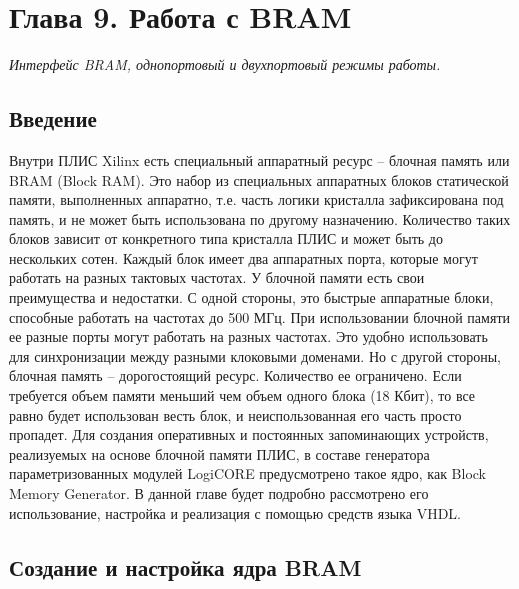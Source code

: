 \chapter{Глава 9. Работа с BRAM}

\emph{Интерфейс BRAM, однопортовый и двухпортовый режимы работы.}

\section{Введение}

Внутри ПЛИС Xilinx есть специальный аппаратный ресурс – блочная память или BRAM (Block RAM). Это набор из специальных аппаратных блоков статической памяти, выполненных аппаратно, т.е. часть логики кристалла зафиксирована под память, и не может быть использована по другому назначению. Количество таких блоков зависит от конкретного типа кристалла ПЛИС и может быть до нескольких сотен. Каждый блок имеет два аппаратных порта, которые могут работать на разных тактовых частотах. 
У блочной памяти есть свои преимущества и недостатки. С одной стороны, это быстрые аппаратные блоки, способные работать на частотах до 500 МГц. При использовании блочной памяти ее разные порты могут работать на разных частотах. Это удобно использовать для синхронизации между разными клоковыми доменами. Но с другой стороны, блочная память – дорогостоящий ресурс. Количество ее ограничено. Если требуется объем памяти меньший чем объем одного блока (18 Кбит), то все равно будет использован весть блок, и неиспользованная его часть просто пропадет. 
Для создания оперативных и постоянных запоминающих устройств, реализуемых на основе блочной памяти ПЛИС, в составе генератора параметризованных модулей LogiCORE предусмотрено такое ядро, как Block Memory Generator. В данной главе будет подробно рассмотрено его использование, настройка и реализация с помощью средств языка VHDL.

\section{Создание и настройка ядра BRAM}

